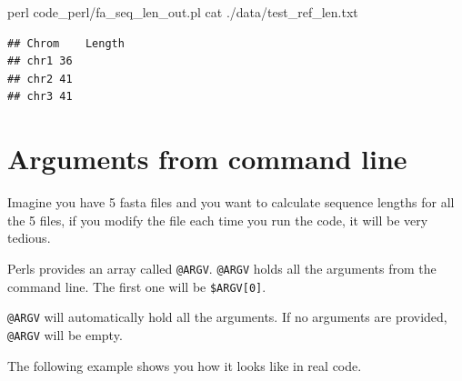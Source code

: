 \documentclass[]{book}
\makeatletter
\newenvironment{Shaded}{\begin{snugshade}}{\end{snugshade}}
\newcommand{\CharTok}[1]{\textcolor[rgb]{0.31,0.60,0.02}{#1}}
\newcommand{\DataTypeTok}[1]{\textcolor[rgb]{0.13,0.29,0.53}{#1}}
\newcommand{\FunctionTok}[1]{\textcolor[rgb]{0.00,0.00,0.00}{#1}}
\newcommand{\KeywordTok}[1]{\textcolor[rgb]{0.13,0.29,0.53}{\textbf{#1}}}
\newcommand{\NormalTok}[1]{#1}
\newcommand{\StringTok}[1]{\textcolor[rgb]{0.31,0.60,0.02}{#1}}
\newenvironment{kframe}{%
\medskip{}
\setlength{\fboxsep}{.8em}
 \def\at@end@of@kframe{}%
 \ifinner\ifhmode%
  \def\at@end@of@kframe{\end{minipage}}%
  \begin{minipage}{\columnwidth}%
 \fi\fi%
 \def\FrameCommand##1{\hskip\@totalleftmargin \hskip-\fboxsep
 \colorbox{shadecolor}{##1}\hskip-\fboxsep
     \hskip-\linewidth \hskip-\@totalleftmargin \hskip\columnwidth}%
 \MakeFramed {\advance\hsize-\width
   \@totalleftmargin\z@ \linewidth\hsize
   \@setminipage}}%
 {\par\unskip\endMakeFramed%
 \at@end@of@kframe}
\renewenvironment{Shaded}{\begin{kframe}}{\end{kframe}}
\makeatother
\begin{document}
\begin{Shaded}
\begin{Highlighting}[]
\FunctionTok{perl}\NormalTok{ code_perl/fa_seq_len_out.pl}
\FunctionTok{cat}\NormalTok{ ./data/test_ref_len.txt}
\end{Highlighting}
\end{Shaded}

\begin{verbatim}
## Chrom    Length
## chr1 36
## chr2 41
## chr3 41
\end{verbatim}

\hypertarget{arguments-from-command-line}{%
\section{Arguments from command line}\label{arguments-from-command-line}}

Imagine you have 5 fasta files and you want to calculate sequence lengths for all the 5 files, if you modify the file each time you run the code, it will be very tedious.

Perls provides an array called \texttt{@ARGV}. \texttt{@ARGV} holds all the arguments from the command line. The first one will be \texttt{\$ARGV{[}0{]}}.

\texttt{@ARGV} will automatically hold all the arguments. If no arguments are provided, \texttt{@ARGV} will be empty.

The following example shows you how it looks like in real code.

\begin{Shaded}
\end{Shaded}
\end{document}
